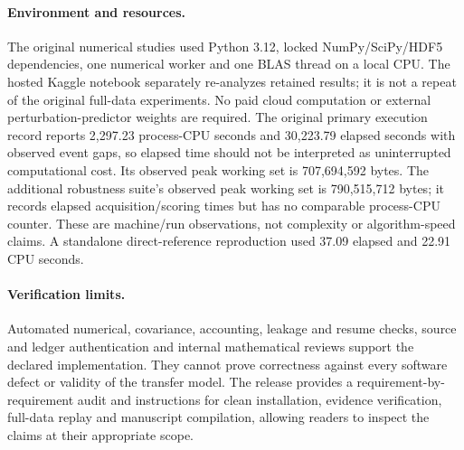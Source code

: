 \paragraph{Environment and resources.} The original numerical studies used Python 3.12, locked NumPy/SciPy/HDF5 dependencies, one numerical worker and one BLAS thread on a local CPU. The hosted Kaggle notebook separately re-analyzes retained results; it is not a repeat of the original full-data experiments. No paid cloud computation or external perturbation-predictor weights are required. The original primary execution record reports 2,297.23 process-CPU seconds and 30,223.79 elapsed seconds with observed event gaps, so elapsed time should not be interpreted as uninterrupted computational cost. Its observed peak working set is 707,694,592 bytes. The additional robustness suite's observed peak working set is 790,515,712 bytes; it records elapsed acquisition/scoring times but has no comparable process-CPU counter. These are machine/run observations, not complexity or algorithm-speed claims. A standalone direct-reference reproduction used 37.09 elapsed and 22.91 CPU seconds.

\paragraph{Verification limits.} Automated numerical, covariance, accounting, leakage and resume checks, source and ledger authentication and internal mathematical reviews support the declared implementation. They cannot prove correctness against every software defect or validity of the transfer model. The release provides a requirement-by-requirement audit and instructions for clean installation, evidence verification, full-data replay and manuscript compilation, allowing readers to inspect the claims at their appropriate scope.
